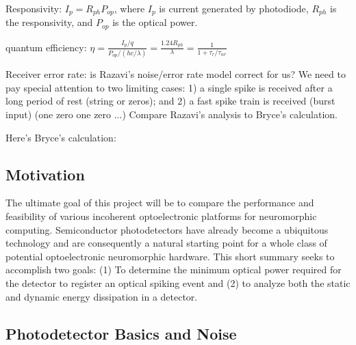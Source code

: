 \documentclass[twocolumn]{article}
\begin{document}
\vspace{2em}
\noindent Responsivity: $I_p = R_{ph}P_{op}$, where $I_p$ is current generated by photodiode, $R_{ph}$ is the responsivity, and $P_{op}$ is the optical power.

\vspace{2em}
\noindent quantum efficiency: $\eta = \frac{I_p/q}{P_{op}/(hc/\lambda)} = \frac{1.24R_{ph}}{\lambda} = \frac{1}{1+\tau_{r}/\tau_{nr}}$

\vspace{2em}
\noindent Receiver error rate: is Razavi's noise/error rate model correct for us? We need to pay special attention to two limiting cases: 1) a single spike is received after a long period of rest (string or zeros); and 2) a fast spike train is received (burst input) (one zero one zero ...) Compare Razavi's analysis to Bryce's calculation. 

Here's Bryce's calculation:

\subsection{Motivation}
The ultimate goal of this project will be to compare the performance and feasibility of various incoherent optoelectronic platforms for neuromorphic computing. Semiconductor photodetectors have already become a ubiquitous technology and are consequently a natural starting point for a whole class of potential optoelectronic neuromorphic hardware. This short summary seeks to accomplish two goals: (1) To determine the minimum optical power required for the detector to register an optical spiking event and (2) to analyze both the static and dynamic energy dissipation in a detector.

\subsection{Photodetector Basics and Noise}
\end{document}
